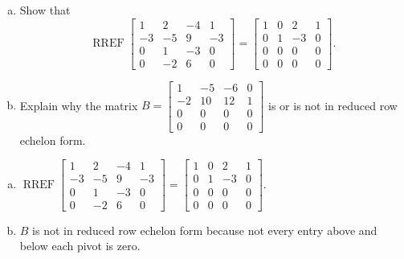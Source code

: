 
\begin{exerciseStatement}

\begin{enumerate}[(a)]
\item Show that \[\operatorname{RREF} \left[\begin{array}{cccc}
1 & 2 & -4 & 1 \\
-3 & -5 & 9 & -3 \\
0 & 1 & -3 & 0 \\
0 & -2 & 6 & 0
\end{array}\right] = \left[\begin{array}{cccc}
1 & 0 & 2 & 1 \\
0 & 1 & -3 & 0 \\
0 & 0 & 0 & 0 \\
0 & 0 & 0 & 0
\end{array}\right] .\]
\item Explain why the matrix \(B= \left[\begin{array}{cccc}
1 & -5 & -6 & 0 \\
-2 & 10 & 12 & 1 \\
0 & 0 & 0 & 0 \\
0 & 0 & 0 & 0
\end{array}\right] \) is or is not in reduced row echelon form.
\end{enumerate}
    
\end{exerciseStatement}
    
\begin{exerciseAnswer} 

\begin{enumerate}[(a)]
\item \(\operatorname{RREF} \left[\begin{array}{cccc}
1 & 2 & -4 & 1 \\
-3 & -5 & 9 & -3 \\
0 & 1 & -3 & 0 \\
0 & -2 & 6 & 0
\end{array}\right] = \left[\begin{array}{cccc}
1 & 0 & 2 & 1 \\
0 & 1 & -3 & 0 \\
0 & 0 & 0 & 0 \\
0 & 0 & 0 & 0
\end{array}\right] .\)
\item \(B\) is not in reduced row echelon form because not every entry above and below each pivot is zero. 
\end{enumerate}
    
\end{exerciseAnswer}
    
